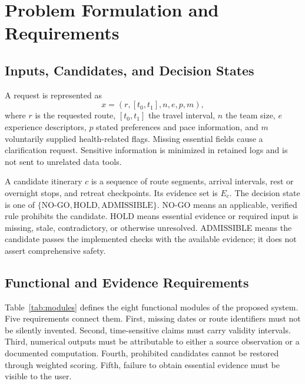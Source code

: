 \documentclass[conference]{IEEEtran}
\begin{document}
\section{Problem Formulation and Requirements}
\subsection{Inputs, Candidates, and Decision States}
A request is represented as
\begin{equation}
 x=(r,[t_0,t_1],n,e,p,m),
\end{equation}
where $r$ is the requested route, $[t_0,t_1]$ the travel interval, $n$ the team size, $e$ experience descriptors, $p$ stated preferences and pace information, and $m$ voluntarily supplied health-related flags. Missing essential fields cause a clarification request. Sensitive information is minimized in retained logs and is not sent to unrelated data tools.

A candidate itinerary $c$ is a sequence of route segments, arrival intervals, rest or overnight stops, and retreat checkpoints. Its evidence set is $E_c$. The decision state is one of $\{\text{NO-GO},\text{HOLD},\text{ADMISSIBLE}\}$. NO-GO means an applicable, verified rule prohibits the candidate. HOLD means essential evidence or required input is missing, stale, contradictory, or otherwise unresolved. ADMISSIBLE means the candidate passes the implemented checks with the available evidence; it does not assert comprehensive safety.

\subsection{Functional and Evidence Requirements}
Table~\ref{tab:modules} defines the eight functional modules of the proposed system. Five requirements connect them. First, missing dates or route identifiers must not be silently invented. Second, time-sensitive claims must carry validity intervals. Third, numerical outputs must be attributable to either a source observation or a documented computation. Fourth, prohibited candidates cannot be restored through weighted scoring. Fifth, failure to obtain essential evidence must be visible to the user.
\end{document}
